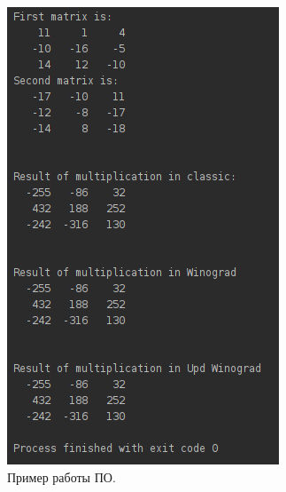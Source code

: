 \documentclass[12pt]{report}
\begin{document}
\begin{figure}
\begin{center}
\includegraphics[scale=1]{inc/img/randExample.png}
\captionsetup{justification=centering}
	\caption{Пример работы ПО.}
	\label{img:exampleRand}	
\end{center}
\end{figure}
\end{document}
